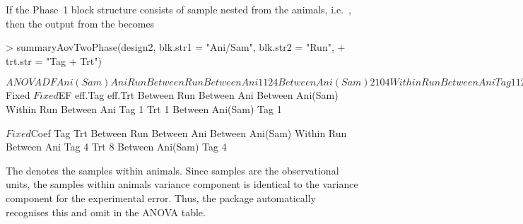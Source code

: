 \documentclass[article]{jss}
\begin{document}
If the Phase~1 block structure consists of sample nested from the animals, i.e.\ , then the output from the  becomes
\begin{CodeChunk}
\begin{CodeInput}
> summaryAovTwoPhase(design2, blk.str1 = "Ani/Sam", blk.str2 = "Run", 
+  trt.str = "Tag + Trt")                                    
\end{CodeInput}
\begin{CodeOutput}
$ANOVA
                    DF Ani(Sam) Ani Run
Between Run                            
   Between Ani      1  1        2   4  
   Between Ani(Sam) 2  1        0   4  
Within Run                             
   Between Ani                         
      Tag           1  1        2   0  
      Trt           1  1        2   0  
      Residual      4  1        2   0  
   Between Ani(Sam)                    
      Tag           2  1        0   0  
      Residual      4  1        0   0  

$Fixed
$Fixed$EF
                    eff.Tag eff.Trt
Between Run                        
   Between Ani                     
   Between Ani(Sam)                
Within Run                         
   Between Ani                     
      Tag           1              
      Trt                   1      
   Between Ani(Sam)                
      Tag           1              

$Fixed$Coef
                    Tag Trt
Between Run                
   Between Ani             
   Between Ani(Sam)        
Within Run                 
   Between Ani             
      Tag           4      
      Trt               8  
   Between Ani(Sam)        
      Tag           4      
\end{CodeOutput}
\end{CodeChunk}
The  denotes the samples within animals. Since samples are the observational units, the samples within animals variance component is identical to the variance component for the experimental error. Thus, the package automatically recognises this and omit  in the ANOVA table.
\end{document}
